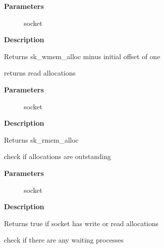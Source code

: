 \documentclass[a4paper,8pt,english]{sphinxmanual}
\begin{document}
\textbf{Parameters}
\begin{description}
\item[{}] \leavevmode
socket

\end{description}

\textbf{Description}

Returns sk\_wmem\_alloc minus initial offset of one

\begin{fulllineitems}
\label{networking/kapi:c.sk_rmem_alloc_get}
returns read allocations

\end{fulllineitems}


\textbf{Parameters}
\begin{description}
\item[{}] \leavevmode
socket

\end{description}

\textbf{Description}

Returns sk\_rmem\_alloc

\begin{fulllineitems}
\label{networking/kapi:c.sk_has_allocations}
check if allocations are outstanding

\end{fulllineitems}


\textbf{Parameters}
\begin{description}
\item[{}] \leavevmode
socket

\end{description}

\textbf{Description}

Returns true if socket has write or read allocations

\begin{fulllineitems}
\label{networking/kapi:c.skwq_has_sleeper}
check if there are any waiting processes

\end{fulllineitems}
\end{document}
